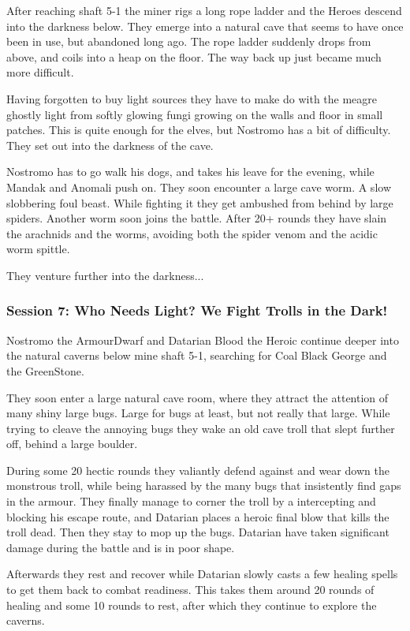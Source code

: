 After reaching shaft 5-1 the miner rigs a long rope ladder and the Heroes descend into the darkness below. They emerge into a natural cave that seems to have once been in use, but abandoned long ago. The rope ladder suddenly drops from above, and coils into a heap on the floor. The way back up just became much more difficult.

Having forgotten to buy light sources they have to make do with the meagre ghostly light from softly glowing fungi growing on the walls and floor in small patches. This is quite enough for the elves, but Nostromo has a bit of difficulty. They set out into the darkness of the cave.

Nostromo has to go walk his dogs, and takes his leave for the evening, while Mandak and Anomali push on. They soon encounter a large cave worm. A slow slobbering foul beast. While fighting it they get ambushed from behind by large spiders. Another worm soon joins the battle. After 20+ rounds they have slain the arachnids and the worms, avoiding both the spider venom and the acidic worm spittle.

They venture further into the darkness...


\subsubsection*{Session 7: Who Needs Light? We Fight Trolls in the Dark!}
Nostromo the ArmourDwarf and Datarian Blood the Heroic continue deeper into the natural caverns below mine shaft 5-1, searching for Coal Black George and the GreenStone.

They soon enter a large natural cave room, where they attract the attention of many shiny large bugs. Large for bugs at least, but not really that large. While trying to cleave the annoying bugs they wake an old cave troll that slept further off, behind a large boulder.

During some 20 hectic rounds they valiantly defend against and wear down the monstrous troll, while being harassed by the many bugs that insistently find gaps in the armour. They finally manage to corner the troll by a intercepting and blocking his escape route, and Datarian places a heroic final blow that kills the troll dead. Then they stay to mop up the bugs. Datarian have taken significant damage during the battle and is in poor shape.

Afterwards they rest and recover while Datarian slowly casts a few healing spells to get them back to combat readiness. This takes them around 20 rounds of healing and some 10 rounds to rest, after which they continue to explore the caverns.

